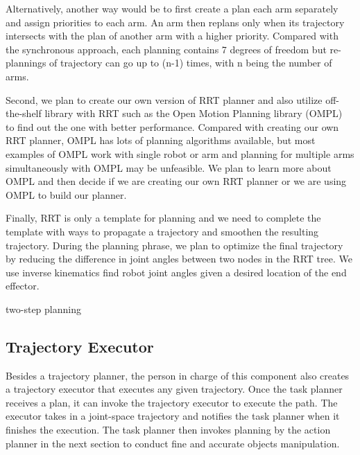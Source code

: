 Alternatively, another way would be to first create a plan each arm separately and assign priorities to each arm. An arm then replans only when its trajectory intersects with the plan of another arm with a higher priority. Compared with the synchronous approach, each planning contains 7 degrees of freedom but re-plannings of trajectory can go up to (n-1) times, with n being the number of arms. 

Second, we plan to create our own version of RRT planner and also utilize off-the-shelf library with RRT such as the Open Motion Planning library (OMPL)~\cite{sucan2012the-open-motion-planning-library} to find out the one with better performance.
Compared with creating our own RRT planner, OMPL has lots of planning algorithms available, but most examples of OMPL work with single robot or arm and planning for multiple arms simultaneously with OMPL may be unfeasible. We plan to learn more about OMPL and then decide if we are creating our own RRT planner or we are using OMPL to build our planner.

Finally, RRT is only a template for planning and we need to complete the template with ways to propagate a trajectory and smoothen the resulting trajectory. 
During the planning phrase, we plan to optimize the final trajectory by reducing the difference in joint angles between two nodes in the RRT tree. We use inverse kinematics find robot joint angles given a desired location of the end effector.




two-step planning


\subsection{Trajectory Executor}

Besides a trajectory planner, the person in charge of this component also creates a trajectory executor that executes any given trajectory.
Once the task planner receives a plan, it can invoke the trajectory executor to execute the path. The executor takes in a joint-space trajectory and notifies the task planner when it finishes the execution. The task planner then invokes planning by the action planner in the next section to conduct fine and accurate objects manipulation.

